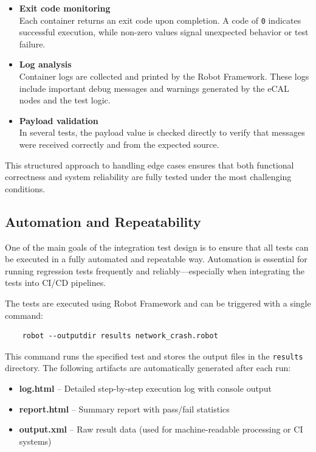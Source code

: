 \begin{itemize}
	\item \textbf{Exit code monitoring} \\
	Each container returns an exit code upon completion. A code of \texttt{0} indicates successful execution, while non-zero values signal unexpected behavior or test failure.
	
	\item \textbf{Log analysis} \\
	Container logs are collected and printed by the Robot Framework. These logs include important debug messages and warnings generated by the eCAL nodes and the test logic.
	
	\item \textbf{Payload validation} \\
	In several tests, the payload value is checked directly to verify that messages were received correctly and from the expected source.
\end{itemize}

This structured approach to handling edge cases ensures that both functional correctness and system reliability are fully tested under the most challenging conditions.


\subsection{Automation and Repeatability}

One of the main goals of the integration test design is to ensure that all tests can be executed in a fully automated and repeatable way. Automation is essential for running regression tests frequently and reliably—especially when integrating the tests into CI/CD pipelines.

\vspace{0.9em}
The tests are executed using Robot Framework and can be triggered with a single command:

\begin{verbatim}
	robot --outputdir results network_crash.robot
\end{verbatim}

\vspace{0.5em}
This command runs the specified test and stores the output files in the \texttt{results} directory. The following artifacts are automatically generated after each run:

\begin{itemize}
	\item \textbf{log.html} – Detailed step-by-step execution log with console output
	\item \textbf{report.html} – Summary report with pass/fail statistics
	\item \textbf{output.xml} – Raw result data (used for machine-readable processing or CI systems)
\end{itemize}

